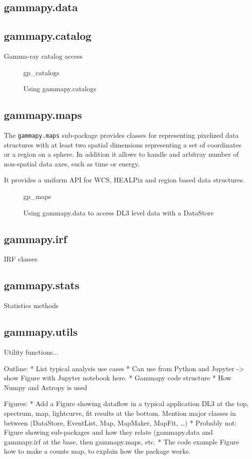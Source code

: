 \subsection{gammapy.data}

\subsection{gammapy.catalog}
Gamma-ray catalog access

\begin{figure}
	{gp_catalogs}
	\caption{Using gammapy.catalogs}
	\label{codeexample:data}
\end{figure}

\subsection{gammapy.maps}
The \verb|gammapy.maps| sub-package provides classes for representing pixelized
data structures with at least two spatial dimensions representing a set of
coordinates or a region on a sphere. In addition it allows to handle and
arbitray  number of non-spatial data axes, such as time or energy.

It provides a uniform API for WCS, HEALPix and region based data structures.

\begin{figure}

	{gp_maps}
	\caption{Using gammapy.data to access DL3 level data with a DataStore}
	\label{codeexample:data}
\end{figure}

\subsection{gammapy.irf}
IRF classes

\subsection{gammapy.stats}
Statistics methods

\subsection{gammapy.utils}
Utility functions...

Outline: * List typical analysis use cases * Can use from Python and Jupyter ->
show Figure with Jupyter notebook here. * Gammapy code structure * How Numpy
and Astropy is used

Figures: * Add a Figure showing dataflow in a typical application DL3 at the
top, spectrum, map, lightcurve, fit results at the bottom. Mention major
classes in between (DataStore, EventList, Map, MapMaker, MapFit, …) * Probably
not: Figure showing sub-packages and how they relate (gammapy.data and
gammapy.irf at the base, then gammapy.maps, etc. * The code example Figure how
to make a counts map, to explain how the package works.

